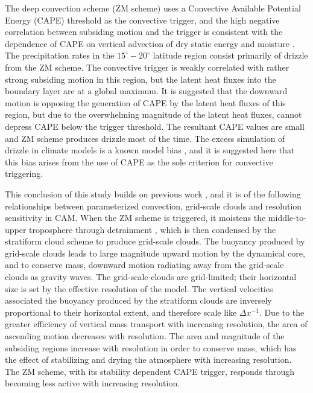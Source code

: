 The \cite{ZM1995AO} deep convection scheme (ZM scheme) uses a Convective Available Potential Energy (CAPE) threshold as the convective trigger, and the high negative correlation between subsiding motion and the trigger is consistent with the dependence of CAPE on vertical advection of dry static energy and moisture \citep{Z2002JGR}. The precipitation rates in the $15^{\circ} - 20^{\circ}$ latitude region consist primarily of drizzle from the ZM scheme. The convective trigger is weakly correlated with rather strong subsiding motion in this region, but the latent heat fluxes into the boundary layer are at a global maximum. It is suggested that the downward motion is opposing the generation of CAPE by the latent heat fluxes of this region, but due to the overwhelming magnitude of the latent heat fluxes, cannot depress CAPE below the trigger threshold. The resultant CAPE values are small and ZM scheme produces drizzle most of the time. The excess simulation of drizzle in climate models is a known model bias \citep{D2006JCLIM}, and it is suggested here that this bias arises from the use of CAPE as the sole criterion for convective triggering.

This conclusion of this study builds on previous work \citep[][Chapter~\ref{sec:chapter5}]{HR2017JCLIM,HR2018JAMES}, and it is of the following relationships between parameterized convection, grid-scale clouds and resolution sensitivity in CAM. When the ZM scheme is triggered, it moistens the middle-to-upper troposphere through detrainment \citep{ZM1995AO}, which is then condensed by the stratiform cloud scheme to produce grid-scale clouds. The buoyancy produced by grid-scale clouds leads to large magnitude upward motion by the dynamical core, and to conserve mass, downward motion radiating away from the grid-scale clouds as gravity waves. The grid-scale clouds are grid-limited; their horizontal size is set by the effective resolution of the model. The vertical velocities associated the buoyancy produced by the stratiform clouds are inversely proportional to their horizontal extent, and therefore scale like $\Delta x^{-1}$. Due to the greater efficiency of vertical mass transport with increasing resolution, the area of ascending motion decreases with resolution. The area and magnitude of the subsiding regions increase with resolution in order to conserve mass, which has the effect of stabilizing and drying the atmosphere with increasing resolution. The ZM scheme, with its stability dependent CAPE trigger, responds through becoming less active with increasing resolution.

